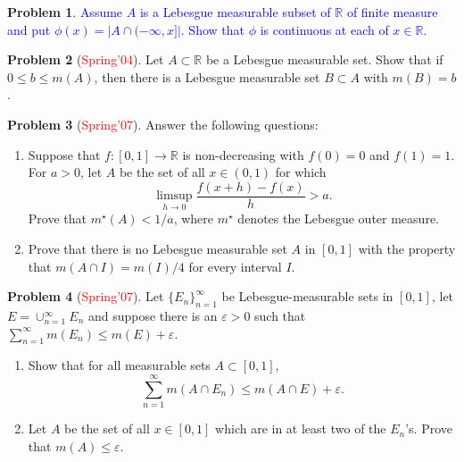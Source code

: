\documentclass[12pt]{amsart}
\def\field#1{\mathbb{#1}}
\def\abs#1{\lvert {#1} \rvert}
\theoremstyle{definition}
\newtheorem{problem}{Problem}
\theoremstyle{remark}
\begin{document}
\begin{problem}
  \textcolor{blue}{ Assume $A$ is a Lebesgue measurable subset of
    $\field{R}$ of finite measure and put $\phi(x) = \abs{A \cap
      (-\infty, x]}$. Show that $\phi$ is continuous at each of $x \in
    \field{R}$.}
\end{problem}
\begin{problem}[\textcolor{red}{Spring'04}]
  Let $A \subset \field{R}$ be a Lebesgue measurable set.  Show that
  if $0 \leq b \leq m(A)$, then there is a Lebesgue measurable set $B
  \subset A$ with $m(B) = b$.
\end{problem}
\begin{problem}[\textcolor{red}{Spring'07}]
Answer the following questions:
\begin{enumerate}
\item Suppose that $f\colon [0,1] \to \field{R}$ is non-decreasing
  with $f(0)=0$ and $f(1)=1$. For $a>0$, let $A$ be the set of all $x
  \in (0,1)$ for which
  \begin{equation*}
    \limsup_{h \to 0} \frac{f(x+h) - f(x)}{h} > a.
  \end{equation*}
  Prove that $m^\star(A) < 1/a$, where $m^\star$ denotes the Lebesgue
  outer measure.
\item Prove that there is no Lebesgue measurable set $A$ in $[0,1]$
  with the property that $m(A\cap I) = m(I)/4$ for every interval $I$.
\end{enumerate}
\end{problem}
\begin{problem}[\textcolor{red}{Spring'07}]
  Let $\{ E_n \}_{n=1}^\infty$ be Lebesgue-measurable sets in $[0,1]$,
  let $E= \displaystyle{\cup_{n=1}^\infty} E_n$ and suppose there
  is an $\varepsilon > 0$ such that $\displaystyle{\sum_{n=1}^\infty}
  m(E_n) \leq m(E) + \varepsilon$.
\begin{enumerate}
\item Show that for all measurable sets $A \subset [0,1]$,
  \begin{equation*}
    \sum_{n=1}^\infty m(A \cap E_n) \leq m(A \cap E) + \varepsilon.
  \end{equation*}
\item Let $A$ be the set of all $x \in [0,1]$ which are in at least
  two of the $E_n$'s. Prove that $m(A) \leq \varepsilon$.
\end{enumerate}
\end{problem}
\end{document}
